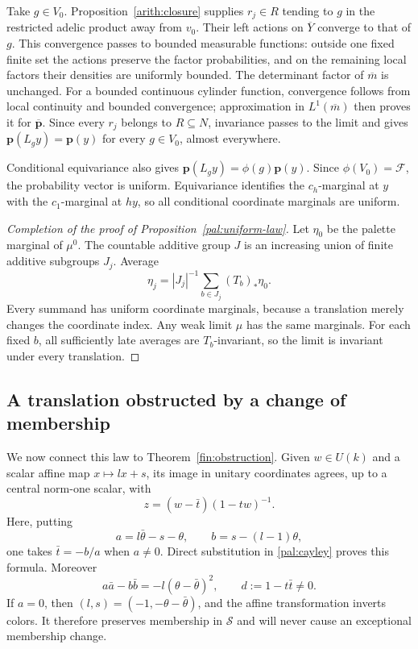 Take $g\in V_0$.  Proposition~\ref{arith:closure} supplies
$r_j\in R$ tending to $g$ in the restricted adelic product away from
$v_0$.  Their left actions on $\overline Y$ converge to that of $g$.
This convergence passes to bounded measurable functions: outside one
fixed finite set the actions preserve the factor probabilities, and
on the remaining local factors their densities are uniformly bounded.
The determinant factor of $\overline m$ is unchanged.  For a bounded continuous
cylinder function, convergence follows from local continuity and
bounded convergence; approximation in $L^1(\overline m)$ then proves
it for $\overline{\mathbf p}$.  Since every $r_j$ belongs to
$R\subseteq N$, invariance passes to the limit and gives
$\mathbf p(L_g y)=\mathbf p(y)$ for every $g\in V_0$, almost everywhere.

Conditional equivariance also gives
$\mathbf p(L_g y)=\phi(g)\mathbf p(y)$.  Since $\phi(V_0)=\mathcal F$,
the probability vector is uniform.  Equivariance identifies the
$c_h$-marginal at $y$ with the $c_1$-marginal at $hy$, so all conditional
coordinate marginals are uniform.

\begin{proof}[Completion of the proof of Proposition~\ref{pal:uniform-law}]
Let $\eta_0$ be the palette marginal of $\mu^0$.  The countable additive
group $J$ is an increasing union of finite additive subgroups $J_j$.
Average
\[
 \eta_j=|J_j|^{-1}\sum_{b\in J_j}(T_b)_*\eta_0.
\]
Every summand has uniform coordinate marginals, because a translation
merely changes the coordinate index.  Any weak limit $\mu$ has the same
marginals.  For each fixed $b$, all sufficiently late averages are
$T_b$-invariant, so the limit is invariant under every translation.
\end{proof}

\subsection{A translation obstructed by a change of membership}

We now connect this law to Theorem~\ref{fin:obstruction}.  Given
$w\in U(k)$ and a scalar affine map $x\mapsto lx+s$, its image in
unitary coordinates agrees, up to a central norm-one scalar, with
\begin{equation}\label{pal:affine-fraction}
 z=(w-\bar t)(1-tw)^{-1}.
\end{equation}
Here, putting
\[
 a=l\bar\theta-s-\theta,\qquad b=s-(l-1)\theta,
\]
one takes $\bar t=-b/a$ when $a\ne0$.  Direct substitution in
\eqref{pal:cayley} proves this formula.  Moreover
\[
 a\bar a-b\bar b=-l(\theta-\bar\theta)^2,\qquad
 d:=1-t\bar t\ne0.
\]
If $a=0$, then $(l,s)=(-1,-\theta-\bar\theta)$, and the affine
transformation inverts colors.  It therefore preserves membership in
$\mathcal S$ and will never cause an exceptional membership change.

